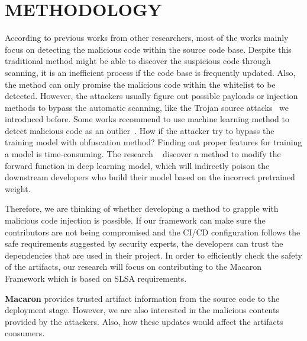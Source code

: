 \section{METHODOLOGY}
According to previous works from other researchers, most of the works mainly focus on detecting the malicious
code within the source code base. Despite this traditional method might be able to discover the suspicious 
code through scanning, it is an inefficient process if the code base is frequently updated. Also, the method 
can only promise the malicious code within the whitelist to be detected. However, the attackers usually 
figure out possible payloads or injection methods to bypass the automatic scanning, like the Trojan source 
attacks~\cite{boucher2023trojan} we introduced before. 
Some works recommend to use machine learning method to detect malicious code as an outlier~\cite{garrett2019detecting}.
How if the attacker try to bypass the training model with obfuscation method? Finding out proper features for
training a model is time-consuming. The research ~\cite{zheng2023careful} discover a method to modify
the forward function in deep learning model, which will indirectly poison the downstream developers who build 
their model based on the incorrect pretrained weight. 

Therefore, we are thinking of whether developing a method to grapple with malicious code injection is possible.
If our framework can make sure the contributors are not being compromised and the CI/CD configuration follows
the safe requirements suggested by security experts, the developers can trust the dependencies that are
used in their project. 
In order to efficiently check the safety of the artifacts, our research will focus on contributing to the Macaron
Framework which is based on SLSA requirements.

\textbf{Macaron} provides trusted artifact information from the source code to the deployment stage. However, we
are also interested in the malicious contents provided by the attackers. Also, how these updates would affect the 
artifacts consumers.     

